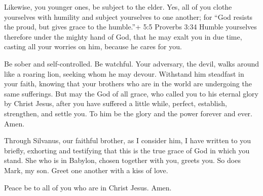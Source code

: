  Likewise, you younger ones, be subject to the elder. Yes,
all of you clothe yourselves with humility and subject yourselves to one
another; for ``God resists the proud, but gives grace to the humble.''+
5:5 Proverbs 3:34  Humble yourselves therefore under the
mighty hand of God, that he may exalt you in due time, 
casting all your worries on him, because he cares for you.

 Be sober and self-controlled. Be watchful. Your adversary,
the devil, walks around like a roaring lion, seeking whom he may devour.
 Withstand him steadfast in your faith, knowing that your
brothers who are in the world are undergoing the same sufferings.
 But may the God of all grace, who called you to his
eternal glory by Christ Jesus, after you have suffered a little while,
perfect, establish, strengthen, and settle you.  To him be
the glory and the power forever and ever. Amen.

 Through Silvanus, our faithful brother, as I consider him,
I have written to you briefly, exhorting and testifying that this is the
true grace of God in which you stand.  She who is in
Babylon, chosen together with you, greets you. So does Mark, my son.
 Greet one another with a kiss of love.

Peace be to all of you who are in Christ Jesus. Amen.
